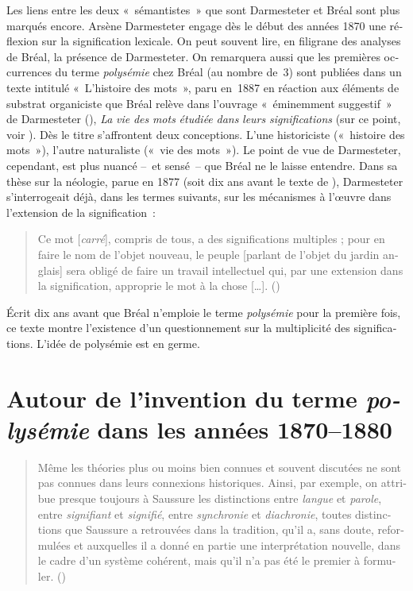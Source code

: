 \documentclass[output=paper]{langsci/langscibook}
\begin{document}
\begin{otherlanguage}{french}
Les liens entre les deux «~sémantistes~» que sont Darmesteter et Bréal sont plus marqués encore. Arsène Darmesteter engage dès le début des années 1870 une réflexion sur la signification lexicale. On peut souvent lire, en filigrane des analyses de Bréal, la présence de Darmesteter. On remarquera aussi que les premières occurrences du terme \textit{polysémie} chez Bréal (au nombre de~3) sont publiées dans un texte intitulé «~L’histoire des mots~», paru en~1887 en réaction aux éléments de substrat organiciste que Bréal relève dans l’ouvrage «~éminemment suggestif~» de Darmesteter (\citealt[469]{meyer_arsene_1888}), \textit{La} \textit{vie} \textit{des} \textit{mots} \textit{étudiée} \textit{dans} \textit{leurs} \textit{significations} (sur ce point, voir \citealt{delesalle_vie_1987}). Dès le titre s’affrontent deux conceptions. L’une historiciste («~histoire des mots~»), l’autre naturaliste («~vie des mots~»). Le point de vue de Darmesteter, cependant, est plus nuancé –~et sensé~– que Bréal ne le laisse entendre. Dans sa thèse sur la néologie, parue en 1877 (soit dix ans avant le texte de \citeauthor{breal_lhistoire_1887}), Darmesteter s’interrogeait déjà, dans les termes suivants, sur les mécanismes à l’œuvre dans l’extension de la signification~:

\begin{quote}
Ce mot [\textit{carré}], compris de tous, a des significations multiples ; pour en faire le nom de l’objet nouveau, le peuple [parlant de l’objet du jardin anglais] sera obligé de faire un travail intellectuel qui, par une extension dans la signification, approprie le mot à la chose […]. (\citealt[33]{darmesteter_creation_1877})
\end{quote}

Écrit dix ans avant que Bréal n’emploie le terme \textit{polysémie} pour la première fois, ce texte montre l’existence d’un questionnement sur la multiplicité des significations. L’idée de polysémie est en germe.

\section{Autour de l’invention du terme \textit{polysémie} dans les années 1870--1880}

\begin{quote}        
Même les théories plus ou moins bien connues et souvent discutées ne sont pas connues dans leurs connexions historiques. Ainsi, par exemple, on attribue presque toujours à Saussure les distinctions entre \textit{langue} et \textit{parole}, entre \textit{signifiant} et \textit{signifié}, entre \textit{synchronie} et \textit{diachronie}, toutes distinctions que Saussure a retrouvées dans la tradition, qu’il a, sans doute, reformulées et auxquelles il a donné en partie une interprétation nouvelle, dans le cadre d’un système cohérent, mais qu’il n’a pas été le premier à formuler. (\citealt[74]{coseriu_georg_1967})
\end{quote}


\end{otherlanguage}
\end{document}
